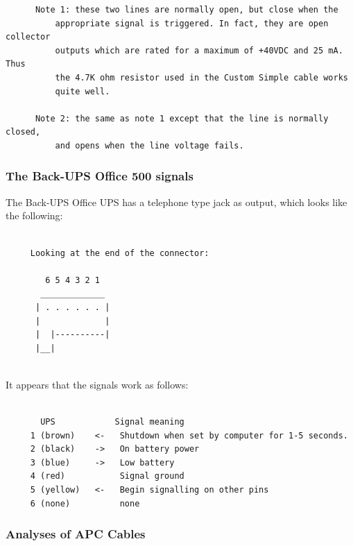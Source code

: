 {{{{{{{{{{\begin{verbatim}
      Note 1: these two lines are normally open, but close when the
          appropriate signal is triggered. In fact, they are open collector
          outputs which are rated for a maximum of +40VDC and 25 mA. Thus
          the 4.7K ohm resistor used in the Custom Simple cable works
          quite well.
     
      Note 2: the same as note 1 except that the line is normally closed,
          and opens when the line voltage fails.
\end{verbatim}
\normalsize

\label{The-Back_002dUPS-Office-500-signals}

\subsubsection*{The Back-UPS Office 500 signals}

\label{index-Cables_002c-BackUPS-Office-200}
\label{index-BackUPS-Office_002c-cables-201}
The Back-UPS Office UPS has a telephone type jack as output, which looks like
the following: 

\footnotesize
\begin{verbatim}
     
     Looking at the end of the connector:
     
        6 5 4 3 2 1
       _____________
      | . . . . . . |
      |             |
      |  |----------|
      |__|
     
\end{verbatim}
\normalsize

It appears that the signals work as follows: 

\footnotesize
\begin{verbatim}
     
       UPS            Signal meaning
     1 (brown)    <-   Shutdown when set by computer for 1-5 seconds.
     2 (black)    ->   On battery power
     3 (blue)     ->   Low battery
     4 (red)           Signal ground
     5 (yellow)   <-   Begin signalling on other pins
     6 (none)          none
\end{verbatim}
\normalsize

\label{Analyses-of-APC-Cables}

\subsubsection*{Analyses of APC Cables}

}}}}}}}}}}
